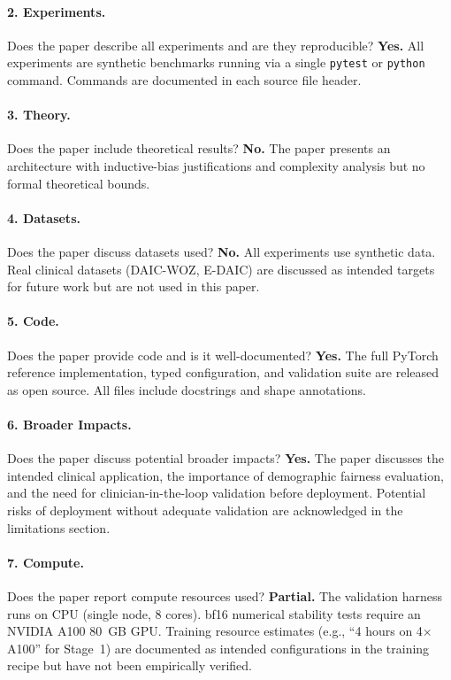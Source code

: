 \documentclass{article}
\begin{document}
\paragraph{2. Experiments.}
Does the paper describe all experiments and are they reproducible?
\textbf{Yes.}
All experiments are synthetic benchmarks running via a single \texttt{pytest} or
\texttt{python} command. Commands are documented in each source file header.

\paragraph{3. Theory.}
Does the paper include theoretical results?
\textbf{No.}
The paper presents an architecture with inductive-bias justifications and complexity
analysis but no formal theoretical bounds.

\paragraph{4. Datasets.}
Does the paper discuss datasets used?
\textbf{No.}
All experiments use synthetic data. Real clinical datasets (DAIC-WOZ, E-DAIC) are
discussed as intended targets for future work but are not used in this paper.

\paragraph{5. Code.}
Does the paper provide code and is it well-documented?
\textbf{Yes.}
The full PyTorch reference implementation, typed configuration, and validation suite
are released as open source. All files include docstrings and shape annotations.

\paragraph{6. Broader Impacts.}
Does the paper discuss potential broader impacts?
\textbf{Yes.}
The paper discusses the intended clinical application, the importance of demographic
fairness evaluation, and the need for clinician-in-the-loop validation before deployment.
Potential risks of deployment without adequate validation are acknowledged in the
limitations section.

\paragraph{7. Compute.}
Does the paper report compute resources used?
\textbf{Partial.}
The validation harness runs on CPU (single node, 8 cores). bf16 numerical stability
tests require an NVIDIA A100 80~GB GPU. Training resource estimates (e.g., ``4 hours
on 4$\times$A100'' for Stage~1) are documented as intended configurations in the
training recipe but have not been empirically verified.
\end{document}
